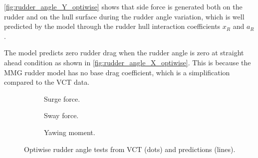 \autoref{fig:rudder_angle_Y_optiwise} shows that side force is generated both on the rudder and on the hull surface during the rudder angle variation, which is well predicted by the model through the rudder hull interaction coefficients $x_R$ and $a_R$. 

The model predicts zero rudder drag when the rudder angle is zero at straight ahead condition as shown in \autoref{fig:rudder_angle_X_optiwise}. This is because the MMG rudder model has no base drag coefficient, which is a simplification compared to the VCT data.
\begin{figure}[h]
     \centering
     \begin{subfigure}[b]{0.32\textwidth}
         \centering
         
        \caption{Surge force.}
        \label{fig:rudder_angle_X_optiwise}
     \end{subfigure}
     \hfill
     \begin{subfigure}[b]{0.32\textwidth}
         \centering
         
        \caption{Sway force.}
        \label{fig:rudder_angle_Y_optiwise}
     \end{subfigure}
     \hfill
     \begin{subfigure}[b]{0.32\textwidth}
         \centering
         
        \caption{Yawing moment.}
        \label{fig:rudder_angle_N_optiwise}
     \end{subfigure}
    \caption{Optiwise rudder angle tests from VCT (dots) and predictions (lines).}
    \label{fig:rudder_angle_optiwise}
\end{figure}

